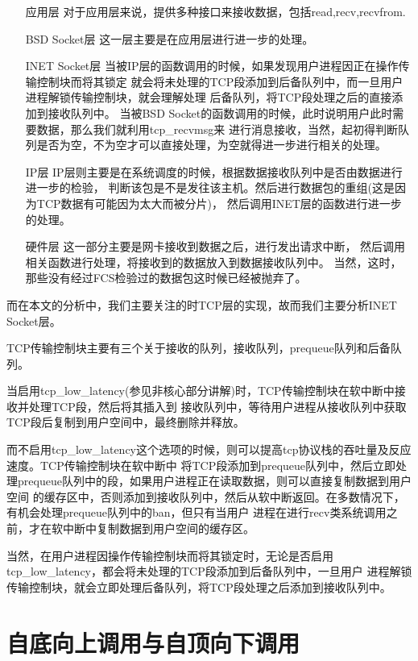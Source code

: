 \begin{enumerate}
\item[应用层]			对于应用层来说，提供多种接口来接收数据，包括read,recv,recvfrom.
\item[BSD Socket层]		这一层主要是在应用层进行进一步的处理。
\item[INET Socket层]		当被IP层的函数调用的时候，如果发现用户进程因正在操作传输控制块而将其锁定
						就会将未处理的TCP段添加到后备队列中，而一旦用户进程解锁传输控制块，就会理解处理
						后备队列，将TCP段处理之后的直接添加到接收队列中。
						当被BSD Socket的函数调用的时候，此时说明用户此时需要数据，那么我们就利用tcp\_recvmsg来
						进行消息接收，当然，起初得判断队列是否为空，不为空才可以直接处理，为空就得进一步进行相关的处理。
\item[IP层]
				IP层则主要是在系统调度的时候，根据数据接收队列中是否由数据进行进一步的检验，
				判断该包是不是发往该主机。然后进行数据包的重组(这是因为TCP数据有可能因为太大而被分片)，
				然后调用INET层的函数进行进一步的处理。
\item[硬件层]     这一部分主要是网卡接收到数据之后，进行发出请求中断，
				  然后调用相关函数进行处理，将接收到的数据放入到数据接收队列中。
					当然，这时，那些没有经过FCS检验过的数据包这时候已经被抛弃了。
\end{enumerate}

		而在本文的分析中，我们主要关注的时TCP层的实现，故而我们主要分析INET Socket层。

		TCP传输控制块主要有三个关于接收的队列，接收队列，prequeue队列和后备队列。

		当启用tcp\_low\_latency(参见非核心部分讲解)时，TCP传输控制块在软中断中接收并处理TCP段，然后将其插入到
		接收队列中，等待用户进程从接收队列中获取TCP段后复制到用户空间中，最终删除并释放。

		而不启用tcp\_low\_latency这个选项的时候，则可以提高tcp协议栈的吞吐量及反应速度。TCP传输控制块在软中断中
		将TCP段添加到prequeue队列中，然后立即处理prequeue队列中的段，如果用户进程正在读取数据，则可以直接复制数据到用户空间
		的缓存区中，否则添加到接收队列中，然后从软中断返回。在多数情况下，有机会处理prequeue队列中的ban，但只有当用户
		进程在进行recv类系统调用之前，才在软中断中复制数据到用户空间的缓存区。

		当然，在用户进程因操作传输控制块而将其锁定时，无论是否启用tcp\_low\_latency，都会将未处理的TCP段添加到后备队列中，一旦用户
		进程解锁传输控制块，就会立即处理后备队列，将TCP段处理之后添加到接收队列中。
	\section{自底向上调用与自顶向下调用}
